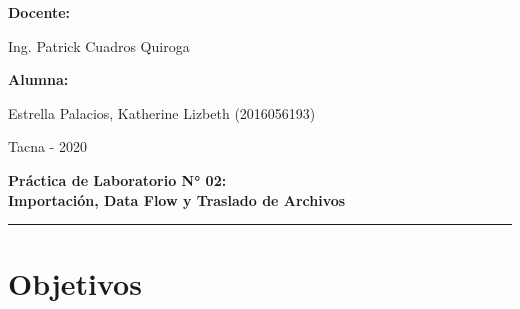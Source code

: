 \documentclass[12pt,letterpaper]{article}
\begin{document}
\begin{titlepage}
\begin{center}
	\vspace*{0.3in}
	\begin{Large}
	\textbf{Docente:} \\
	\end{Large}
	
	\vspace*{0.1in}
	\begin{large}
	 Ing. Patrick Cuadros Quiroga\\
	\end{large}
	
	\vspace*{0.2in}
	\vspace*{0.1in}
	\begin{large}
	\textbf{Alumna:} \\
	\begin{flushleft}
	Estrella Palacios, Katherine Lizbeth	\hfill	(2016056193) 
	\end{flushleft}
	\end{large}

	\vspace*{0.5in}
	\begin{large}
	 Tacna - 2020\\
	\end{large}

	\end{center}

\end{titlepage}


\tableofcontents %
\thispagestyle{empty} %
\newpage
\setcounter{page}{1} %

\begin{center}
\begin{LARGE}
	\textbf{Práctica de Laboratorio N° 02: \\ Importación, Data Flow y Traslado de Archivos} \\ 
\end{LARGE}
\rule{175mm}{0.1mm}
\end{center}




\section{Objetivos}
\end{document}
